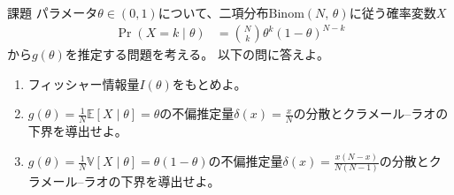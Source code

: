 \documentclass[lualatex,handout]{beamer}
\newcommand{\expt}[1]{\mathbb{E}\left[#1\right]}
\newcommand{\var}[1]{\mathbb{V}\left[#1\right]}
\theoremstyle{definition}
\begin{document}
\begin{frame}{課題}
\small
パラメータ$\theta\in(0,1)$について、二項分布$\mathrm{Binom}(N,\,\theta)$に従う確率変数$X$
\begin{align*}
\Pr(X=k\mid\theta)&=\binom{N}{k}\theta^k(1-\theta)^{N-k}
\end{align*}
から$g(\theta)$を推定する問題を考える。
以下の問に答えよ。

\vspace{1em}
\begin{enumerate}
\setlength{\itemsep}{2em}
\item フィッシャー情報量$I(\theta)$をもとめよ。
\item $g(\theta)=\frac1N\expt{X\mid\theta}=\theta$の不偏推定量$\delta(x)=\frac{x}{N}$の分散とクラメール--ラオの下界を導出せよ。
\item $g(\theta)=\frac1N\var{X\mid\theta}=\theta(1-\theta)$の不偏推定量$\delta(x)=\frac{x(N-x)}{N(N-1)}$の分散とクラメール--ラオの下界を導出せよ。
\end{enumerate}
\end{frame}
\end{document}
